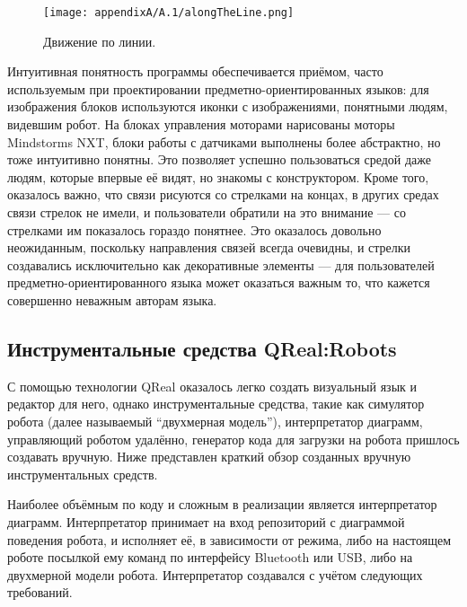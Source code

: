 \begin{figure} [ht]
	\begin{center}
		\texttt{[image: appendixA/A.1/alongTheLine.png]}
		\caption{Движение по линии.}
		\label{image:alongTheLine}
	\end{center}
\end{figure}

Интуитивная понятность программы обеспечивается приёмом, часто используемым при проектировании 
предметно-ориентированных языков: для изображения блоков используются иконки с изображениями, 
понятными людям, видевшим робот. На блоках управления моторами нарисованы моторы Mindstorms NXT, 
блоки работы с датчиками выполнены более абстрактно, но тоже интуитивно понятны. Это 
позволяет успешно пользоваться средой даже людям, которые впервые её видят, но знакомы 
с конструктором. Кроме того, оказалось важно, что связи рисуются со стрелками на концах, 
в других средах связи стрелок не имели, и пользователи обратили на это внимание --- 
со стрелками им показалось гораздо понятнее. Это оказалось довольно неожиданным, поскольку 
направления связей всегда очевидны, и стрелки создавались исключительно как декоративные 
элементы --- для пользователей предметно-ориентированного языка может оказаться важным 
то, что кажется совершенно неважным авторам языка.

\subsection{Инструментальные средства QReal:Robots}
С помощью технологии QReal оказалось легко создать визуальный язык и редактор для него, 
однако инструментальные средства, такие как симулятор робота (далее называемый "`двухмерная модель"'), 
интерпретатор диаграмм, управляющий роботом удалённо, генератор кода для загрузки на 
робота пришлось создавать вручную. Ниже представлен краткий обзор созданных вручную 
инструментальных средств.

Наиболее объёмным по коду и сложным в реализации является интерпретатор диаграмм. 
Интерпретатор принимает на вход репозиторий с диаграммой поведения робота, и исполняет 
её, в зависимости от режима, либо на настоящем роботе посылкой ему команд по интерфейсу 
Bluetooth или USB, либо на двухмерной модели робота. Интерпретатор создавался с учётом 
следующих требований.

